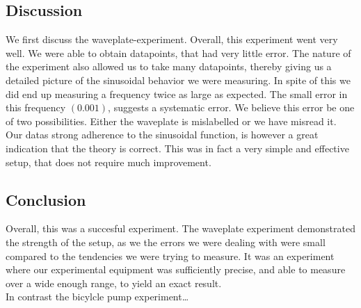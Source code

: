 \documentclass[working, oneside]{inputs/tuftebook}
\begin{document}
\subsection*{Discussion}
We first discuss the waveplate-experiment. Overall, this experiment went very well. We were able to obtain datapoints, that had very little error. The nature of the experiment also allowed us to take many datapoints, thereby giving us a detailed picture of the sinusoidal behavior we were measuring. In spite of this we did end up measuring a frequency twice as large as expected. The small error in this frequency $(0.001)$, suggests a systematic error. We believe this error be one of two possibilities. Either the waveplate is mislabelled or we have misread it. Our datas strong adherence to the sinusoidal function, is however a great indication that the theory is correct. This was in fact a very simple and effective setup, that does not require much improvement.
\subsection*{Conclusion}
Overall, this was a succesful experiment. The waveplate experiment demonstrated the strength of the setup, as we the errors we were dealing with were small compared to the tendencies we were trying to measure. It was an experiment where our experimental equipment was sufficiently precise, and able to measure over a wide enough range, to yield an exact result. \\
In contrast the bicylcle pump experiment\ldots
\end{document}
